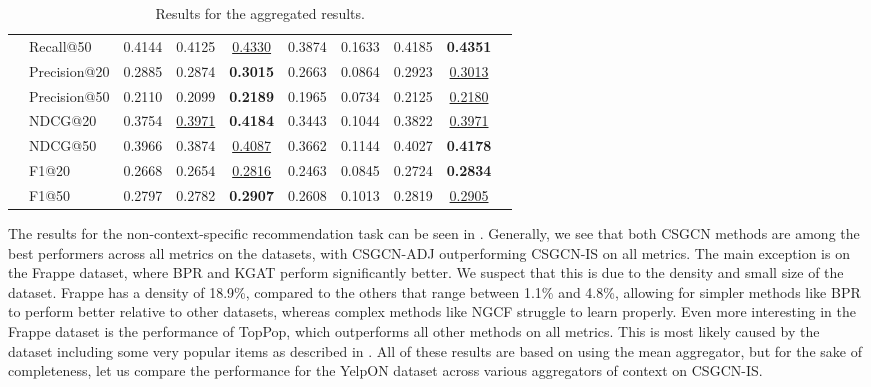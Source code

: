 \begin{table*}[]
{\begin{tabular}{@{}l|l|cccccc|cc@{}}
                        & Recall@50    & 0.4144       & 0.4125       & {\ul {0.4330}}    & 0.3874 & 0.1633          & 0.4185 & \textbf{0.4351} &  \\
                        & Precision@20 & 0.2885       & 0.2874       & \textbf{0.3015} & 0.2663 & 0.0864          & 0.2923 & {\ul {0.3013}}    &  \\
                        & Precision@50 & 0.2110       & 0.2099       & \textbf{0.2189} & 0.1965 & 0.0734          & 0.2125 & {\ul {0.2180}}    &  \\
                        & NDCG@20      & 0.3754       & {\ul{ 0.3971}} & \textbf{0.4184} & 0.3443 & 0.1044          & 0.3822 & {\ul {0.3971}}    &  \\
                        & NDCG@50      & 0.3966       & 0.3874       & {\ul {0.4087}}    & 0.3662 & 0.1144          & 0.4027 & \textbf{0.4178} &  \\
                        & F1@20        & 0.2668       & 0.2654       & {\ul{0.2816}}    & 0.2463 & 0.0845          & 0.2724 & \textbf{0.2834} &  \\
                        & F1@50        & 0.2797       & 0.2782       & \textbf{0.2907} & 0.2608 & 0.1013          & 0.2819 & {\ul{0.2905}}    &  \\ \bottomrule
\end{tabular}%
}
\caption{Results for the aggregated results.}
\label{tab:aggregatedresults}
\end{table*}
The results for the non-context-specific recommendation task can be seen in .
Generally, we see that both CSGCN methods are among the best performers across all metrics on the datasets, with CSGCN-ADJ outperforming CSGCN-IS on all metrics.
The main exception is on the Frappe dataset, where BPR and KGAT perform significantly better.
We suspect that this is due to the density and small size of the dataset.
Frappe has a density of 18.9\%, compared to the others that range between 1.1\% and 4.8\%, allowing for simpler methods like BPR to perform better relative to other datasets, whereas complex methods like NGCF struggle to learn properly.
Even more interesting in the Frappe dataset is the performance of TopPop, which outperforms all other methods on all metrics.
This is most likely caused by the dataset including some very popular items as described in .
All of these results are based on using the mean aggregator, but for the sake of completeness, let us compare the performance for the YelpON dataset across various aggregators of context on CSGCN-IS.

